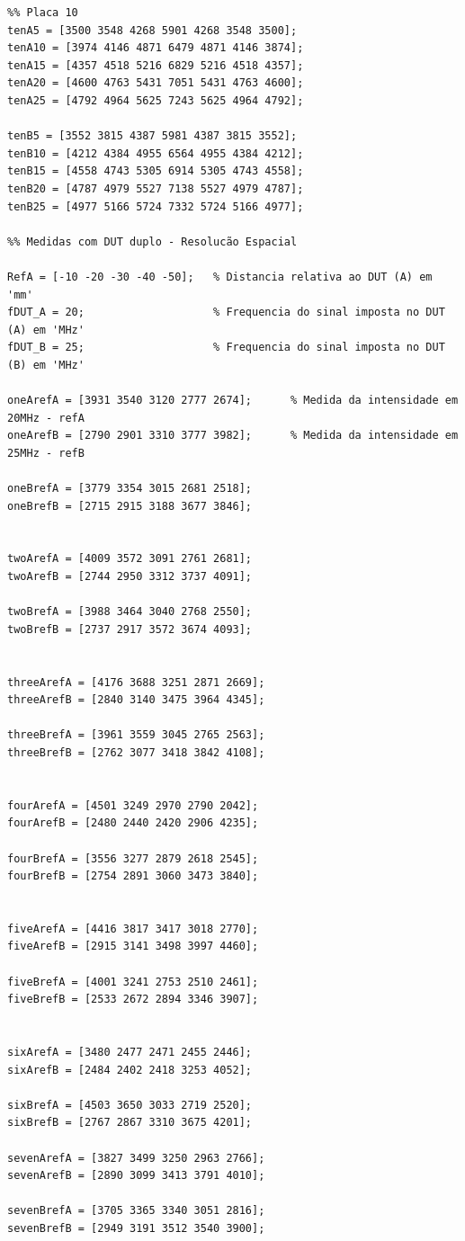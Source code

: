 \begin{lstlisting}
%% Placa 10
tenA5 = [3500 3548 4268 5901 4268 3548 3500];
tenA10 = [3974 4146 4871 6479 4871 4146 3874];
tenA15 = [4357 4518 5216 6829 5216 4518 4357];
tenA20 = [4600 4763 5431 7051 5431 4763 4600];
tenA25 = [4792 4964 5625 7243 5625 4964 4792];

tenB5 = [3552 3815 4387 5981 4387 3815 3552];
tenB10 = [4212 4384 4955 6564 4955 4384 4212];
tenB15 = [4558 4743 5305 6914 5305 4743 4558];
tenB20 = [4787 4979 5527 7138 5527 4979 4787];
tenB25 = [4977 5166 5724 7332 5724 5166 4977];

%% Medidas com DUT duplo - Resolucão Espacial

RefA = [-10 -20 -30 -40 -50];   % Distancia relativa ao DUT (A) em 'mm'
fDUT_A = 20;                    % Frequencia do sinal imposta no DUT (A) em 'MHz'
fDUT_B = 25;                    % Frequencia do sinal imposta no DUT (B) em 'MHz'
    
oneArefA = [3931 3540 3120 2777 2674];      % Medida da intensidade em 20MHz - refA
oneArefB = [2790 2901 3310 3777 3982];      % Medida da intensidade em 25MHz - refB

oneBrefA = [3779 3354 3015 2681 2518];
oneBrefB = [2715 2915 3188 3677 3846];


twoArefA = [4009 3572 3091 2761 2681];
twoArefB = [2744 2950 3312 3737 4091];

twoBrefA = [3988 3464 3040 2768 2550];
twoBrefB = [2737 2917 3572 3674 4093];


threeArefA = [4176 3688 3251 2871 2669];
threeArefB = [2840 3140 3475 3964 4345];

threeBrefA = [3961 3559 3045 2765 2563];
threeBrefB = [2762 3077 3418 3842 4108];


fourArefA = [4501 3249 2970 2790 2042];
fourArefB = [2480 2440 2420 2906 4235];

fourBrefA = [3556 3277 2879 2618 2545];
fourBrefB = [2754 2891 3060 3473 3840];


fiveArefA = [4416 3817 3417 3018 2770];
fiveArefB = [2915 3141 3498 3997 4460];

fiveBrefA = [4001 3241 2753 2510 2461];
fiveBrefB = [2533 2672 2894 3346 3907];


sixArefA = [3480 2477 2471 2455 2446];
sixArefB = [2484 2402 2418 3253 4052];

sixBrefA = [4503 3650 3033 2719 2520];
sixBrefB = [2767 2867 3310 3675 4201];

sevenArefA = [3827 3499 3250 2963 2766];
sevenArefB = [2890 3099 3413 3791 4010];

sevenBrefA = [3705 3365 3340 3051 2816];
sevenBrefB = [2949 3191 3512 3540 3900];


\end{lstlisting}
